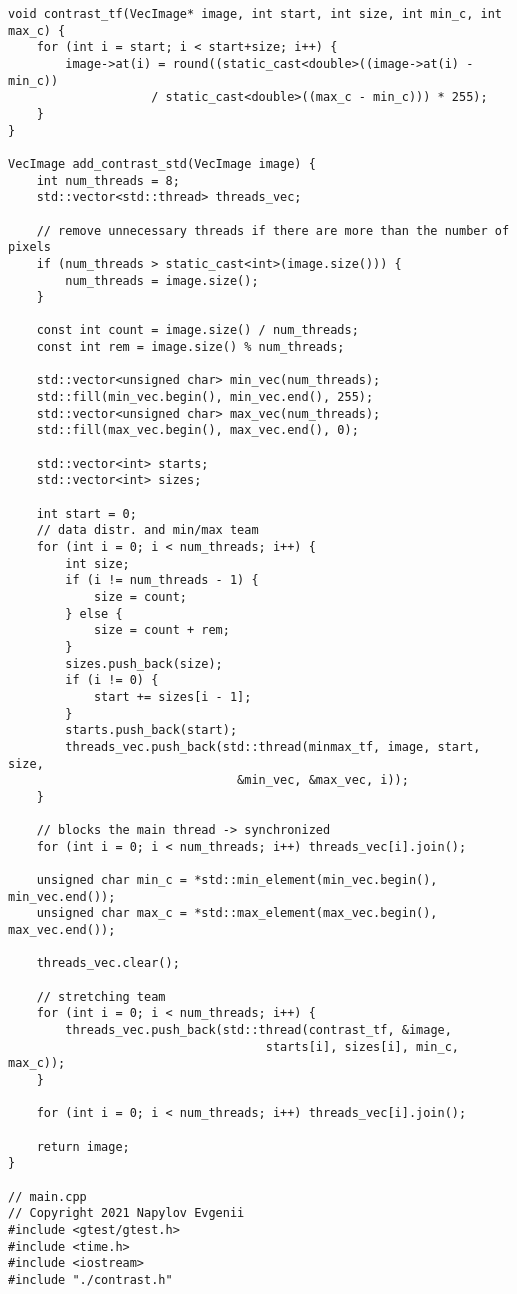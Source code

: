\documentclass{report}
\begin{document}
\begin{lstlisting}
void contrast_tf(VecImage* image, int start, int size, int min_c, int max_c) {
    for (int i = start; i < start+size; i++) {
        image->at(i) = round((static_cast<double>((image->at(i) - min_c))
                    / static_cast<double>((max_c - min_c))) * 255);
    }
}

VecImage add_contrast_std(VecImage image) {
    int num_threads = 8;
    std::vector<std::thread> threads_vec;

    // remove unnecessary threads if there are more than the number of pixels
    if (num_threads > static_cast<int>(image.size())) {
        num_threads = image.size();
    }

    const int count = image.size() / num_threads;
    const int rem = image.size() % num_threads;

    std::vector<unsigned char> min_vec(num_threads);
    std::fill(min_vec.begin(), min_vec.end(), 255);
    std::vector<unsigned char> max_vec(num_threads);
    std::fill(max_vec.begin(), max_vec.end(), 0);

    std::vector<int> starts;
    std::vector<int> sizes;

    int start = 0;
    // data distr. and min/max team
    for (int i = 0; i < num_threads; i++) {
        int size;
        if (i != num_threads - 1) {
            size = count;
        } else {
            size = count + rem;
        }
        sizes.push_back(size);
        if (i != 0) {
            start += sizes[i - 1];
        }
        starts.push_back(start);
        threads_vec.push_back(std::thread(minmax_tf, image, start, size,
                                &min_vec, &max_vec, i));
    }

    // blocks the main thread -> synchronized
    for (int i = 0; i < num_threads; i++) threads_vec[i].join();

    unsigned char min_c = *std::min_element(min_vec.begin(), min_vec.end());
    unsigned char max_c = *std::max_element(max_vec.begin(), max_vec.end());

    threads_vec.clear();

    // stretching team
    for (int i = 0; i < num_threads; i++) {
        threads_vec.push_back(std::thread(contrast_tf, &image,
                                    starts[i], sizes[i], min_c, max_c));
    }

    for (int i = 0; i < num_threads; i++) threads_vec[i].join();

    return image;
}

// main.cpp
// Copyright 2021 Napylov Evgenii
#include <gtest/gtest.h>
#include <time.h>
#include <iostream>
#include "./contrast.h"


\end{lstlisting}
\end{document}
